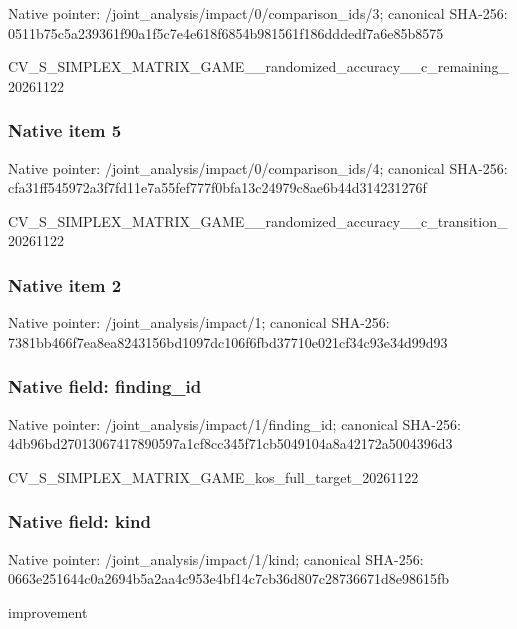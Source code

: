 \documentclass[10pt,a4paper]{article}
\begin{document}
Native pointer: /joint\_analysis/impact/0\allowbreak{}/comparison\_ids/3; canonical SHA-256: 0511b75c5a239361f90a1f5c\allowbreak{}7e4e618f6854b981561f186d\allowbreak{}ddedf7a6e85b8575


CV\_S\_SIMPLEX\_MATRIX\_GAME\allowbreak{}\_\_randomized\_accuracy\_\_c\allowbreak{}\_remaining\_20261122


\subsubsection{Native item 5}


Native pointer: /joint\_analysis/impact/0\allowbreak{}/comparison\_ids/4; canonical SHA-256: cfa31ff545972a3f7fd11e7a\allowbreak{}55fef777f0bfa13c24979c8a\allowbreak{}e6b44d314231276f


CV\_S\_SIMPLEX\_MATRIX\_GAME\allowbreak{}\_\_randomized\_accuracy\_\_c\allowbreak{}\_transition\_20261122


\subsubsection{Native item 2}


Native pointer: /joint\_analysis/impact/1; canonical SHA-256: 7381bb466f7ea8ea8243156b\allowbreak{}d1097dc106f6fbd37710e021\allowbreak{}cf34c93e34d99d93



\subsubsection{Native field: finding\_id}


Native pointer: /joint\_analysis/impact/1/finding\_id; canonical SHA-256: 4db96bd27013067417890597\allowbreak{}a1cf8cc345f71cb5049104a8\allowbreak{}a42172a5004396d3


CV\_S\_SIMPLEX\_MATRIX\_GAME\allowbreak{}\_kos\_full\_target\_2026112\allowbreak{}2


\subsubsection{Native field: kind}


Native pointer: /joint\_analysis/impact/1/kind; canonical SHA-256: 0663e251644c0a2694b5a2aa\allowbreak{}4c953e4bf14c7cb36d807c28\allowbreak{}736671d8e98615fb


improvement
\end{document}
